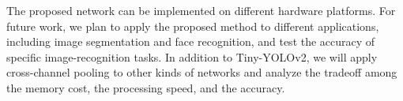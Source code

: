 \documentclass[10pt,twocolumn,letterpaper]{article}
\begin{document}
The proposed network can be implemented on different hardware platforms. For future work, we plan to apply the proposed method to different applications, including image segmentation and face recognition, and test the accuracy of specific image-recognition tasks. In addition to Tiny-YOLOv2, we will apply cross-channel pooling to other kinds of networks and analyze the tradeoff among the memory cost, the processing speed, and the accuracy.

{\small


}
\end{document}
